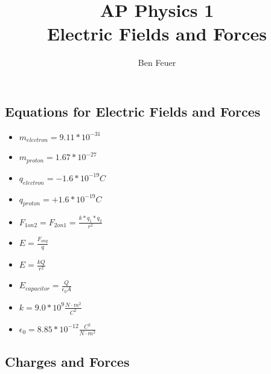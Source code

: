 \documentclass{report}
\title{\Huge{AP Physics 1}\\Electric Fields and Forces}
\author{\huge{Ben Feuer}}
\date{}
\begin{document}
\maketitle
\newpage%
\tableofcontents
\pagebreak

\chapter{}

\section{Equations for Electric Fields and Forces}

\begin{itemize}
  \item $ m_{electron} = 9.11* 10^{-31} $ 
  \item $ m_{proton} = 1.67* 10^{-27}$
  \item $ q_{electron} = -1.6 * 10^{-19} C $ 
  \item $ q_{proton} = +1.6 * 10^{-19} C $
  \item $ F_{1 on 2} = F_{2 on 1} = \frac{k*q_1*q_2}{r^2} $
  \item $ E = \frac{F_{on q}}{q} $ 
  \item $ E = \frac{kQ}{r^2} $ 
  \item $ E_{capacitor} = \frac{Q}{\epsilon_0A} $
  \item $ k = 9.0 * 10^9 \frac{N \cdot m^2}{C^2} $
  \item $ \epsilon_0 = 8.85 * 10^{-12} \frac{C^2}{N\cdot m^2} $
\end{itemize}


\section{Charges and Forces}
\end{document}
